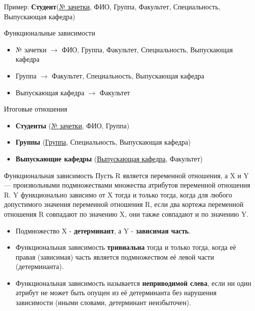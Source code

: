 \documentclass{beamer}
\begin{document}
\begin{frame}
Пример: \textbf{Студент}(\underline{№ зачетки}, ФИО, Группа, Факультет, Специальность, Выпускающая кафедра)
\begin{block}{Функциональные зависимости}
\begin{itemize}
\item № зачетки $\rightarrow$ ФИО, Группа, Факультет, Специальность, Выпускающая кафедра
\item Группа $\rightarrow$ Факультет, Специальность, Выпускающая кафедра
\item Выпускающая кафедра $\rightarrow$ Факультет
\end{itemize}
\end{block}
\begin{block}{Итоговые отношения}  
\begin{itemize}
\item \textbf{Студенты} (\underline{№ зачетки}, ФИО, Группа)
\item \textbf{Группы} (\underline{Группа}, Специальность, Выпускающая кафедра)
\item \textbf{Выпускающие кафедры} (\underline{Выпускающая кафедра}, Факультет)
\end{itemize}
\end{block}
\end{frame}

\begin{frame}
\begin{block}{Функциональная зависимость}
Пусть R является переменной отношения, а X и Y — произвольными подмножествами множества атрибутов переменной отношения R. Y функционально зависимо от X тогда и только тогда, когда для любого допустимого значения переменной отношения R, если два кортежа переменной отношения R совпадают по значению X, они также совпадают и по значению Y.
\end{block}
\begin{itemize}
\item Подмножество X - \textbf{детерминант}, а Y - \textbf{зависимая часть}.
\item Функциональная зависимость \textbf{тривиальна} тогда и только тогда, когда её правая (зависимая) часть является подмножеством её левой части (детерминанта).
\item Функциональная зависимость называется \textbf{неприводимой слева}, если ни один атрибут не может быть опущен из её детерминанта без нарушения зависимости (иными словами, детерминант неизбыточен). 
\end{itemize}
\end{frame}
\end{document}
